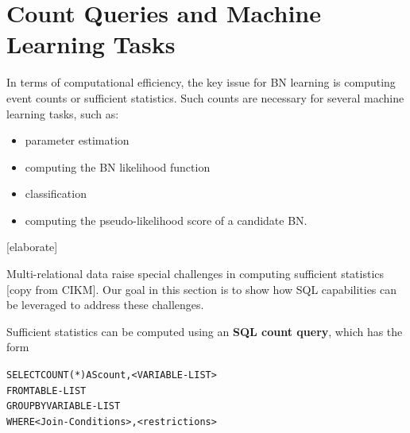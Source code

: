 \documentclass{acm_proc_article-sp}
\begin{document}

\section{Count Queries and Machine Learning Tasks}

In terms of computational efficiency, the key issue for BN learning is computing event counts or sufficient statistics. Such counts are necessary for several machine learning tasks, such as:

\begin{itemize}
\item parameter estimation
\item computing the BN likelihood function
\item classification
\item computing the pseudo-likelihood score of a candidate BN.
\end{itemize}
  
[elaborate]

Multi-relational data raise special challenges in computing sufficient statistics [copy from CIKM]. Our goal in this section is to show how SQL capabilities can be leveraged to address these challenges. 


Sufficient statistics can be computed using an \textbf{SQL count query}, which has the form 
\begin{alltt}
SELECT COUNT(*) AS count, <VARIABLE-LIST>
FROM TABLE-LIST
GROUP BY VARIABLE-LIST
WHERE <Join-Conditions>, <restrictions>
\end{alltt}
\end{document}
